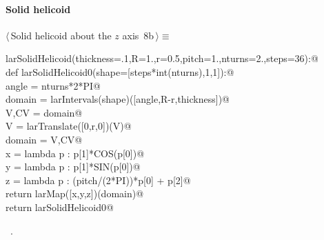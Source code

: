 \documentclass[11pt,oneside]{article}	%
\begin{document}
\paragraph{Solid helicoid}
\begin{flushleft} \small \label{scrap15}
\protect{}$\langle\,$Solid helicoid about the $z$ axis\nobreak\ {\footnotesize 8b}$\,\rangle\equiv$
\vspace{-1ex}
\begin{list}{}{} \item
\mbox{}\verb@def larSolidHelicoid(thickness=.1,R=1.,r=0.5,pitch=1.,nturns=2.,steps=36):@\\
\mbox{}\verb@   def larSolidHelicoid0(shape=[steps*int(nturns),1,1]):@\\
\mbox{}\verb@      angle = nturns*2*PI@\\
\mbox{}\verb@      domain = larIntervals(shape)([angle,R-r,thickness])@\\
\mbox{}\verb@      V,CV = domain@\\
\mbox{}\verb@      V = larTranslate([0,r,0])(V)@\\
\mbox{}\verb@      domain = V,CV@\\
\mbox{}\verb@      x = lambda p : p[1]*COS(p[0])@\\
\mbox{}\verb@      y = lambda p : p[1]*SIN(p[0])@\\
\mbox{}\verb@      z = lambda p : (pitch/(2*PI))*p[0] + p[2]@\\
\mbox{}\verb@      return larMap([x,y,z])(domain)@\\
\mbox{}\verb@   return larSolidHelicoid0@\\
\mbox{}\verb@@{\NWsep}
\end{list}
\vspace{-1ex}
\footnotesize\addtolength{\baselineskip}{-1ex}
\begin{list}{}{\setlength{\itemsep}{-\parsep}\setlength{\itemindent}{-\leftmargin}}
\item \NWtxtMacroRefIn\ .
\end{list}
\end{flushleft}
\end{document}
